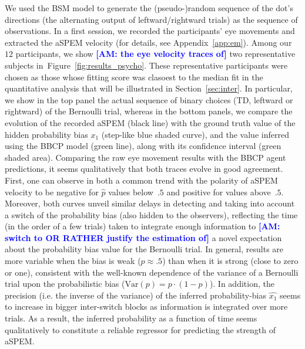 \documentclass[12pt,english]{article}%
\newcommand{\seeFig}[1]{Figure~\ref{fig:#1}}
\newcommand{\seeApp}[1]{Appendix~\ref{app:#1}}
\newcommand{\seeSec}[1]{Section~\ref{sec:#1}}
\newcommand{\AM}[1]{\textbf{\textcolor{blue}{[AM: #1]}}}
\begin{document}
We used the BSM model to generate the (pseudo-)random sequence of
the dot's directions (the alternating output of leftward/rightward trials)
as the sequence of observations.
In a first session, we recorded the participants' eye movements and 
extracted the aSPEM velocity (for details, see \seeApp{em}).
Among our $12$ participants, we show \AM{the eye velocity traces of} two representative subjects in~\seeFig{results_psycho}.
These representative participants were chosen as those
whose fitting score was clasoest to the median fit in the quantitative analysis
that will be illustrated in \seeSec{inter}.
In particular, we show in the top panel the actual sequence of binary choices
(TD, leftward or rightward) of the Bernoulli trial, whereas in the bottom panels, we compare the evolution of the recorded aSPEM (black line) with
the ground truth value of the hidden probability bias $x_1$ (step-like blue shaded curve),
and the value inferred using the BBCP model (green line), along with its confidence interval (green shaded area).
Comparing the raw eye movement results with the BBCP agent predictions,
it seems qualitatively that both traces evolve in good agreement.
First, one can observe in both a common trend with the polarity of aSPEM velocity
to be negative for $\hat{p}$ values below~$.5$ and positive for values above~$.5$.
Moreover, both curves unveil similar delays in detecting and taking into account a switch of the probability bias (also hidden to the observers),
reflecting the time (in the order of a few trials) taken to integrate enough information
to \AM{switch to OR RATHER justify the estimation of} a novel expectation about the probability bias value for the Bernoulli trial.
In general, results are more variable when the bias is weak ($p\approx .5$)
than when it is strong (close to zero or one),
consistent with the well-known dependence of the variance of a Bernoulli trial
upon the probabilistic bias ($\textrm{Var}(p)= p \cdot (1-p)$).
In addition, the precision (i.e. the inverse of the variance)
of the inferred probability-bias $\hat{x_1}$ seems to increase
in bigger inter-switch blocks as information is integrated over more trials.
As a result, the inferred probability as a function of time
seems qualitatively to constitute a reliable regressor
for predicting the strength of aSPEM.
\end{document}
